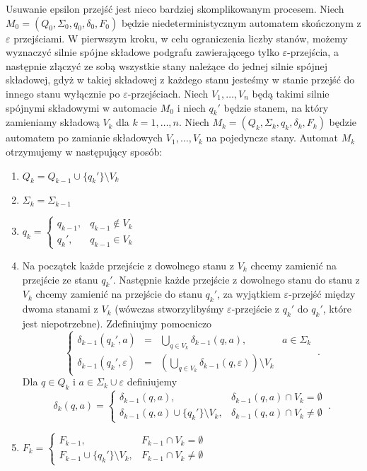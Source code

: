 Usuwanie epsilon przejść jest nieco bardziej skomplikowanym procesem. Niech $M_0=(Q_0,\Sigma_0,q_0,\delta_0,F_0)$ będzie niedeterministycznym automatem skończonym z $\varepsilon$ przejściami. W pierwszym kroku, w celu ograniczenia liczby stanów, możemy wyznaczyć silnie spójne składowe podgrafu zawierającego tylko $\varepsilon$-przejścia, a następnie złączyć ze sobą wszystkie stany należące do jednej silnie spójnej składowej, gdyż w takiej składowej z każdego stanu jesteśmy w stanie przejść do innego stanu wyłącznie po $\varepsilon$-przejściach. Niech $V_1,\dotsc,V_n$ będą takimi silnie spójnymi składowymi w automacie $M_0$ i niech $q_k'$ będzie stanem, na który zamieniamy składową $V_k$ dla $k=1,\dots,n$. Niech $M_k=(Q_k,\Sigma_k,q_k,\delta_k,F_k)$ będzie automatem po zamianie składowych $V_1,\dotsc,V_k$ na pojedyncze stany. Automat $M_k$ otrzymujemy w następujący sposób:
\begin{enumerate}
    \item $Q_k=Q_{k-1}\cup\{q_k'\}\setminus V_k$
    \item $\Sigma_k=\Sigma_{k-1}$
    \item $q_k = \left\{
        \begin{array}{rl}
            q_{k-1}, & q_{k-1}\notin V_k\\
            q_k', & q_{k-1}\in V_k
        \end{array}
        \right.$
    \item Na początek każde przejście z dowolnego stanu z $V_k$ chcemy zamienić na przejście ze stanu $q_k'$. Następnie każde przejście z dowolnego stanu do stanu z $V_k$ chcemy zamienić na przejście do stanu $q_k'$, za wyjątkiem $\varepsilon$-przejść między dwoma stanami z $V_k$ (wówczas stworzylibyśmy $\varepsilon$-przejście z $q_k'$ do $q_k'$, które jest niepotrzebne). Zdefiniujmy pomocniczo
    $$\left\{
        \begin{array}{rcll}
            \delta_{k-1}(q_k',a)&=&\bigcup_{q\in V_k}{\delta_{k-1}(q,a)}, & a\in\Sigma_k\\
            \delta_{k-1}(q_k',\varepsilon)&=&\left(\bigcup_{q\in V_k}{\delta_{k-1}(q,\varepsilon)}\right)\setminus V_k
        \end{array}
        \right.~.$$
    Dla $q\in Q_k$ i $a\in\Sigma_k\cup\varepsilon$ definiujemy
    $$\delta_k(q,a)=\left\{
        \begin{array}{rl}
            \delta_{k-1}(q,a), & \delta_{k-1}(q,a)\cap V_k=\emptyset\\
            \delta_{k-1}(q,a)\cup\{q_k'\}\setminus V_k, & \delta_{k-1}(q,a)\cap V_k\neq\emptyset
        \end{array}
        \right.~.$$
    \item $F_k = \left\{
        \begin{array}{rl}
            F_{k-1}, & F_{k-1}\cap V_k=\emptyset\\
            F_{k-1}\cup\{q_k'\}\setminus V_k, & F_{k-1}\cap V_k\neq\emptyset
        \end{array}
        \right.$
\end{enumerate}
